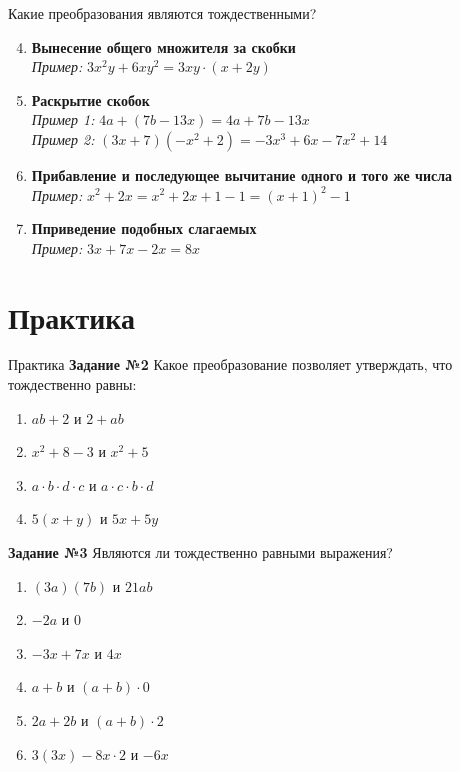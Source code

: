 \documentclass[12pt, aspectratio=169]{beamer}
\begin{document}
\begin{frame}{Какие преобразования являются тождественными?}
	\begin{enumerate}
		\setcounter{enumi}{3}
		\item<1-> {\textbf{Вынесение общего множителя за скобки}\\ \textit{Пример:} $3x^2y+6xy^2=3xy\cdot(x+2y)$}
		\item<2-> {
			\textbf{Раскрытие скобок}\\
			\textit{Пример 1:} $4a+(7b-13x)=4a+7b-13x$\\
			\textit{Пример 2:} $(3x+7)(-x^2+2)=-3x^3+6x-7x^2+14$
		}
		\item<3-> {
			\textbf{Прибавление и последующее вычитание одного и того же числа}\\
			\textit{Пример:} $x^2+2x=x^2+2x+1-1=(x+1)^2-1$
		}
		\item<4-> {
			\textbf{Пприведение подобных слагаемых}\\
			\textit{Пример:} $3x+7x-2x=8x$
		}
	\end{enumerate}
\end{frame}

\section{Практика}

\begin{frame}{Практика}
	\onslide<1->
	\textbf{Задание №2} Какое преобразование позволяет утверждать, что тождественно равны:
	\begin{multicols}{2}
		\begin{enumerate}
			\item $ab+2$ и $2+ab$
			\item $x^2+8-3$ и $x^2+5$
			\item $a\cdot b\cdot d\cdot c$ и $a\cdot c\cdot b\cdot d$
			\item $5(x+y)$ и $5x+5y$
		\end{enumerate}
	\end{multicols}
	\textbf{Задание №3} Являются ли тождественно равными выражения?
	\begin{multicols}{2}
		\begin{enumerate}
			\item $(3a)(7b)$ и $21ab$
			\item $-2a$ и $0$
			\item $-3x+7x$ и $4x$
			\item $a+b$ и $(a+b)\cdot 0$
			\item $2a+2b$ и $(a+b)\cdot 2$
			\item $3(3x)-8x\cdot2$ и $-6x$
		\end{enumerate}
	\end{multicols}
\end{frame}
\end{document}

